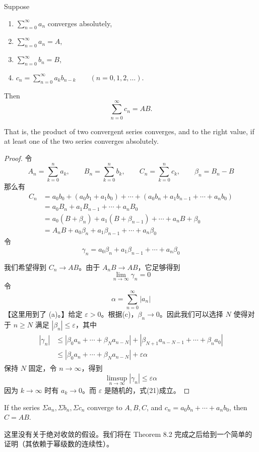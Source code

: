 \documentclass[../poma-notes.tex]{subfiles}
\begin{document}
\begin{theorem}
  Suppose
  \begin{enumerate}[label=(\alph*)]
    \item $\sum_{n=0}^{\infty} a_n$ converges absolutely,
    \item $\sum_{n=0}^{\infty} a_n = A$,
    \item $\sum_{n=0}^{\infty} b_n = B$,
    \item $c_n = \sum_{n=0}^{\infty} a_k b_{n-k} \qquad (n=0,1,2,\dots)$.
  \end{enumerate}
  Then
  \[
    \sum_{n=0}^{\infty} c_n = AB.
  \]

  That is, the product of two convergent series converges, and to the right value, if at least one of the two series converges absolutely.
\end{theorem}

\begin{proof}
  令
  \[
    A_n = \sum_{k=0}^{n} a_k,\qquad B_n = \sum_{k=0}^{n} b_k,\qquad C_n = \sum_{k=0}^{n} c_k,\qquad \beta_n = B_n - B
  \]
  那么有
  \begin{equation*}
    \begin{split}
      C_n & = a_0 b_0 + (a_0 b_1 + a_1 b_0) + \cdots + (a_0 b_n + a_1 b_{n-1} + \cdots + a_n b_0) \\
      & = a_0 B_n + a_1 B_{n-1} + \cdots + a_n B_0 \\
      & = a_0 (B + \beta_n) + a_1 (B + \beta_{n-1}) + \cdots + a_n {B + \beta_0} \\
      & = A_n B + a_0 \beta_n + a_1 \beta_{n-1} + \cdots + a_n \beta_0
    \end{split}
  \end{equation*}
  令
  \[
    \gamma_n = a_0 \beta_n + a_1 \beta_{n-1} + \cdots + a_n \beta_0
  \]

  我们希望得到 $C_n \to AB$。由于 $A_n B \to AB$，它足够得到
  \begin{equation}
    \lim_{n\to\infty} \gamma_n = 0
  \end{equation}
  令
  \[
    \alpha = \sum_{n=0}^{\infty} |a_n|
  \]
  【这里用到了 (a)。】给定 $\varepsilon > 0$。根据(c)，$\beta_n \to 0$。因此我们可以选择 $N$ 使得对于 $n \ge N$ 满足
  $|\beta_n| \le \varepsilon$，其中
  \begin{align*}
    \begin{split}
      |\gamma_n| & \le |\beta_0 a_n + \cdots + \beta_N a_{n-N}| + |\beta_{N+1} a_{n-N-1} + \cdots + \beta_n a_0| \\
      & \le |\beta_0 a_n + \cdots + \beta_N a_{n-N}| + \varepsilon\alpha
    \end{split}
  \end{align*}
  保持 $N$ 固定，令 $n \to \infty$，得到
  \[
    \limsup_{n\to\infty} |\gamma_n| \le \varepsilon\alpha
  \]
  因为 $k \to \infty$ 时有 $a_k \to 0$。而 $\varepsilon$ 是随机的，式(21)成立。
\end{proof}

\begin{theorem}
  If the series $\Sigma a_n, \Sigma b_n, \Sigma c_n$ converge to $A, B, C$, and $c_n = a_0 b_n + \cdots + a_n b_0$, then $C = AB$.
\end{theorem}

这里没有关于绝对收敛的假设。我们将在 Theorem 8.2 完成之后给到一个简单的证明（其依赖于幂级数的连续性）。
\end{document}

